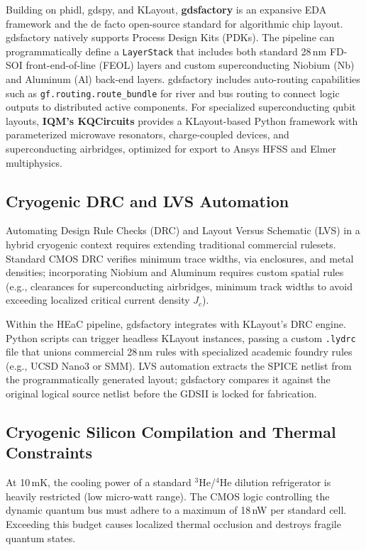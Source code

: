 \documentclass[11pt, a4paper]{article}
\begin{document}
Building on phidl, gdspy, and KLayout, \textbf{gdsfactory} is an expansive EDA framework and the de facto open-source standard for algorithmic chip layout. gdsfactory natively supports Process Design Kits (PDKs). The pipeline can programmatically define a \texttt{LayerStack} that includes both standard 28\,nm FD-SOI front-end-of-line (FEOL) layers and custom superconducting Niobium (Nb) and Aluminum (Al) back-end layers. gdsfactory includes auto-routing capabilities such as \texttt{gf.routing.route\_bundle} for river and bus routing to connect logic outputs to distributed active components. For specialized superconducting qubit layouts, \textbf{IQM's KQCircuits} provides a KLayout-based Python framework with parameterized microwave resonators, charge-coupled devices, and superconducting airbridges, optimized for export to Ansys HFSS and Elmer multiphysics.

\subsection{Cryogenic DRC and LVS Automation}

Automating Design Rule Checks (DRC) and Layout Versus Schematic (LVS) in a hybrid cryogenic context requires extending traditional commercial rulesets. Standard CMOS DRC verifies minimum trace widths, via enclosures, and metal densities; incorporating Niobium and Aluminum requires custom spatial rules (e.g., clearances for superconducting airbridges, minimum track widths to avoid exceeding localized critical current density $J_c$).

Within the HEaC pipeline, gdsfactory integrates with KLayout's DRC engine. Python scripts can trigger headless KLayout instances, passing a custom \texttt{.lydrc} file that unions commercial 28\,nm rules with specialized academic foundry rules (e.g., UCSD Nano3 or SMM). LVS automation extracts the SPICE netlist from the programmatically generated layout; gdsfactory compares it against the original logical source netlist before the GDSII is locked for fabrication.

\subsection{Cryogenic Silicon Compilation and Thermal Constraints}

At 10\,mK, the cooling power of a standard $^3$He/$^4$He dilution refrigerator is heavily restricted (low micro-watt range). The CMOS logic controlling the dynamic quantum bus must adhere to a maximum of 18\,nW per standard cell. Exceeding this budget causes localized thermal occlusion and destroys fragile quantum states.
\end{document}
